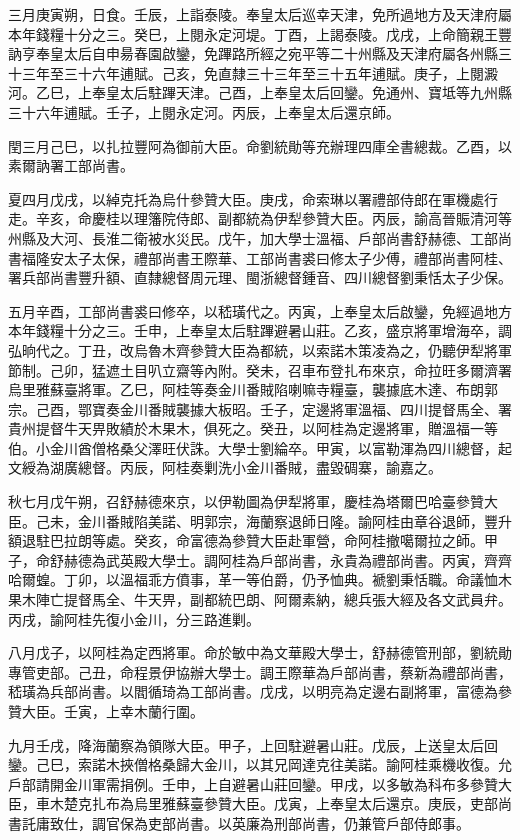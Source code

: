 \begin{pinyinscope}
三月庚寅朔，日食。壬辰，上詣泰陵。奉皇太后巡幸天津，免所過地方及天津府屬本年錢糧十分之三。癸巳，上閱永定河堤。丁酉，上謁泰陵。戊戌，上命簡親王豐訥亨奉皇太后自申昜春園啟鑾，免蹕路所經之宛平等二十州縣及天津府屬各州縣三十三年至三十六年逋賦。己亥，免直隸三十三年至三十五年逋賦。庚子，上閱澱河。乙巳，上奉皇太后駐蹕天津。己酉，上奉皇太后回鑾。免通州、寶坻等九州縣三十六年逋賦。壬子，上閱永定河。丙辰，上奉皇太后還京師。

閏三月己巳，以扎拉豐阿為御前大臣。命劉統勛等充辦理四庫全書總裁。乙酉，以素爾訥署工部尚書。

夏四月戊戌，以綽克托為烏什參贊大臣。庚戌，命索琳以署禮部侍郎在軍機處行走。辛亥，命慶桂以理籓院侍郎、副都統為伊犁參贊大臣。丙辰，諭高晉賑清河等州縣及大河、長淮二衛被水災民。戊午，加大學士溫福、戶部尚書舒赫德、工部尚書福隆安太子太保，禮部尚書王際華、工部尚書裘曰修太子少傅，禮部尚書阿桂、署兵部尚書豐升額、直隸總督周元理、閩浙總督鍾音、四川總督劉秉恬太子少保。

五月辛酉，工部尚書裘曰修卒，以嵇璜代之。丙寅，上奉皇太后啟鑾，免經過地方本年錢糧十分之三。壬申，上奉皇太后駐蹕避暑山莊。乙亥，盛京將軍增海卒，調弘晌代之。丁丑，改烏魯木齊參贊大臣為都統，以索諾木策凌為之，仍聽伊犁將軍節制。己卯，猛遮土目叭立齋等內附。癸未，召車布登扎布來京，命拉旺多爾濟署烏里雅蘇臺將軍。乙巳，阿桂等奏金川番賊陷喇嘛寺糧臺，襲據底木達、布朗郭宗。己酉，鄂寶奏金川番賊襲據大板昭。壬子，定邊將軍溫福、四川提督馬全、署貴州提督牛天畀敗績於木果木，俱死之。癸丑，以阿桂為定邊將軍，贈溫福一等伯。小金川酋僧格桑父澤旺伏誅。大學士劉綸卒。甲寅，以富勒渾為四川總督，起文綬為湖廣總督。丙辰，阿桂奏剿洗小金川番賊，盡毀碉寨，諭嘉之。

秋七月戊午朔，召舒赫德來京，以伊勒圖為伊犁將軍，慶桂為塔爾巴哈臺參贊大臣。己未，金川番賊陷美諾、明郭宗，海蘭察退師日隆。諭阿桂由章谷退師，豐升額退駐巴拉朗等處。癸亥，命富德為參贊大臣赴軍營，命阿桂撤噶爾拉之師。甲子，命舒赫德為武英殿大學士。調阿桂為戶部尚書，永貴為禮部尚書。丙寅，齊齊哈爾蝗。丁卯，以溫福乖方僨事，革一等伯爵，仍予恤典。褫劉秉恬職。命議恤木果木陣亡提督馬全、牛天畀，副都統巴朗、阿爾素納，總兵張大經及各文武員弁。丙戌，諭阿桂先復小金川，分三路進剿。

八月戊子，以阿桂為定西將軍。命於敏中為文華殿大學士，舒赫德管刑部，劉統勛專管吏部。己丑，命程景伊協辦大學士。調王際華為戶部尚書，蔡新為禮部尚書，嵇璜為兵部尚書。以閻循琦為工部尚書。戊戌，以明亮為定邊右副將軍，富德為參贊大臣。壬寅，上幸木蘭行圍。

九月壬戌，降海蘭察為領隊大臣。甲子，上回駐避暑山莊。戊辰，上送皇太后回鑾。己巳，索諾木挾僧格桑歸大金川，以其兄岡達克往美諾。諭阿桂乘機收復。允戶部請開金川軍需捐例。壬申，上自避暑山莊回鑾。甲戌，以多敏為科布多參贊大臣，車木楚克扎布為烏里雅蘇臺參贊大臣。戊寅，上奉皇太后還京。庚辰，吏部尚書託庸致仕，調官保為吏部尚書。以英廉為刑部尚書，仍兼管戶部侍郎事。


\end{pinyinscope}
